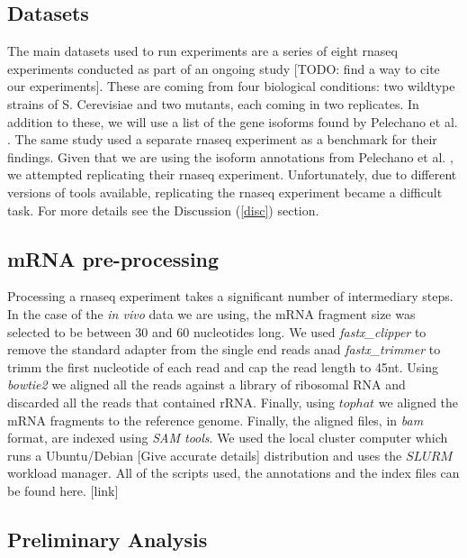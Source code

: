 \documentclass[12pt]{article}
\begin{document}
\subsection{Datasets}

The main datasets used to run experiments are a series of eight \acrshort{rnaseq} experiments conducted as part of an ongoing study {\tiny[TODO: find a way to cite our experiments]}. These are coming from four biological conditions: two wildtype strains of S. Cerevisiae and two mutants, each coming in two replicates. In addition to these, we will use a list of the gene isoforms found by Pelechano et al. \cite{Pelechano2013}. The same study \cite{Pelechano2013} used a separate \cite{Wilkening2013}  \acrshort{rnaseq} experiment as a benchmark for their findings. Given that we are using the isoform annotations from Pelechano et al. \cite{Pelechano2013}, we attempted replicating their \acrshort{rnaseq} experiment. Unfortunately, due to different versions of tools available, replicating the \acrshort{rnaseq} experiment became a difficult task. For more details see the Discussion (\ref{disc}) section. 

\subsection{mRNA pre-processing}
Processing a \acrshort{rnaseq} experiment takes a significant number of intermediary steps. In the case of the \textit{in vivo} data we are using, the mRNA fragment size was selected to be between 30 and 60 nucleotides long. We used \textit{fastx\_clipper} to remove the standard adapter from the single end reads anad \textit{fastx\_trimmer}  to trimm the first nucleotide of each read and cap the read length to 45nt. Using \textit{bowtie2} we aligned all the reads against a library of ribosomal RNA and discarded all the reads that  contained rRNA. Finally, using $tophat$ we aligned the mRNA fragments to the reference genome. Finally, the aligned files, in \textit{bam} format, are indexed using \textit{SAM tools}. We used the local cluster computer which runs a Ubuntu/Debian [Give accurate details] distribution and uses the $SLURM$ workload manager. All of the scripts used, the annotations and the index files can be found here. [link]

\subsection{Preliminary Analysis}
\end{document}
